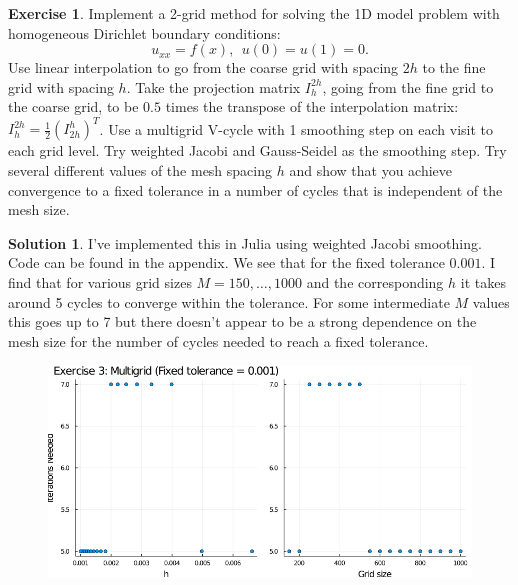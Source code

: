 \documentclass[12pt]{article}
\theoremstyle{definition}
\newtheorem{exer}{Exercise}
\newtheorem{sol}{Solution}
\theoremstyle{remark}
\begin{document}
\newpage

\begin{exer}
Implement a 2-grid method for solving the 1D model problem with homogeneous Dirichlet
boundary conditions:
\[
u_{xx} = f(x) ,~~u(0) = u(1) = 0.
\]
Use linear interpolation to go from the coarse grid with spacing $2h$ to the fine grid
with spacing $h$.  Take the projection matrix $I_h^{2h}$, going from the fine grid to the
coarse grid, to be $0.5$ times the transpose of the interpolation matrix: 
$I_h^{2h} = \frac{1}{2} ( I_{2h}^h )^T$.
Use a multigrid V-cycle with 1 smoothing step on each visit to each grid level. 
Try weighted Jacobi and Gauss-Seidel as the smoothing step.
Try several different values of the mesh spacing $h$ and show that you achieve convergence to
a fixed tolerance in a number of cycles that is independent of the mesh size.
\end{exer}

\begin{sol}
    I've implemented this in Julia using weighted Jacobi smoothing. Code can be found in the appendix. We see that for the fixed tolerance $0.001$. I find that for various grid sizes $M = 150, \ldots, 1000$ and the corresponding $h$ it takes around 5 cycles to converge within the tolerance. For some intermediate $M$ values this goes up to 7 but there doesn't appear to be a strong dependence on the mesh size for the number of cycles needed to reach a fixed tolerance.

    \begin{figure}[ht]
        \centering
        \includegraphics[width=0.8\linewidth]{figs/hw-6-exer-3-multigrid.png}
        \caption{}%
        \label{fig:Exercise_3}
    \end{figure}
\end{sol}

\newpage
\end{document}
